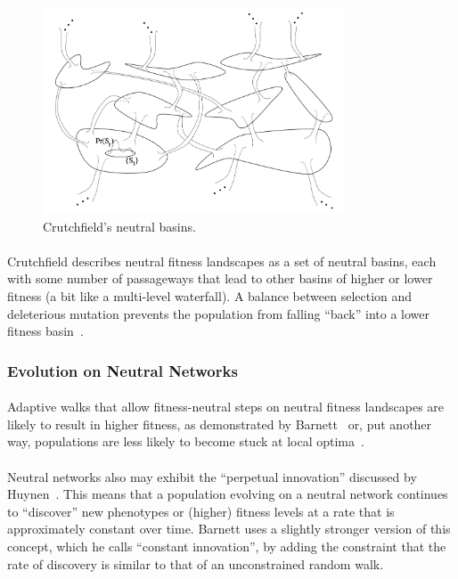 \documentclass[12pt,letterpaper,titlepage]{article}
\begin{document}
\begin{figure}
    \centering
    \includegraphics[width=0.8\textwidth]{crutchfield-basins}
    \caption{Crutchfield's neutral basins.}
\label{fig:crutchfield-basins}
\end{figure}

\paragraph{}
Crutchfield describes neutral fitness landscapes as a set of neutral basins,
each with some number of passageways that lead to other basins of higher or
lower fitness (a bit like a multi-level waterfall). A balance between selection
and deleterious mutation prevents the population from falling ``back'' into a
lower fitness basin~\cite{Crutchfield1999}.

\subsubsection{Evolution on Neutral Networks}

\paragraph{}
Adaptive walks that allow fitness-neutral steps on neutral fitness landscapes
are likely to result in higher fitness, as demonstrated by
Barnett~\cite{Barnett1998} or, put another way, populations are less likely to
become stuck at local optima~\cite{Newman1998}.

\paragraph{}
Neutral networks also may exhibit the ``perpetual innovation'' discussed by
Huynen~\cite{Huynen1996}. This means that a population evolving on a neutral
network continues to ``discover'' new phenotypes or (higher) fitness levels at
a rate that is approximately constant over time. Barnett uses a slightly
stronger version of this concept, which he calls ``constant innovation'', by
adding the constraint that the rate of discovery is similar to that of an
unconstrained random walk.
\end{document}
